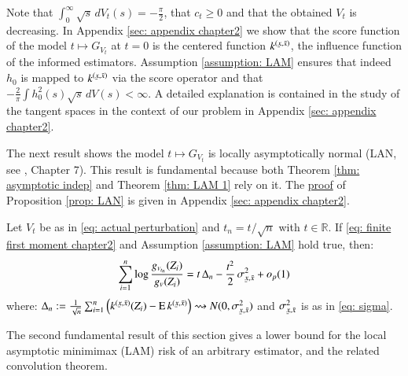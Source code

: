 Note that $ \int_0^{\infty} \sqrt{s} \, d V_t(s)=-\frac{\pi}{2}$, that $c_t \geq 0$ and that the obtained $V_t$ is decreasing. In Appendix \ref{sec: appendix chapter2} we show that the score function of the model $t \mapsto G_{\scriptscriptstyle{V_t}}$ at $t=0$ is the centered function $k^{(\ubar{x},\bar{x})}$, the influence function of the informed estimators. Assumption \ref{assumption: LAM} ensures that indeed $h_0$ is mapped to $k^{(\ubar{x},\bar{x})}$ via the score operator and that $- \frac{2}{\pi}\int h_0^2 (s) \sqrt{s} \, dV(s) < \infty$. A detailed explanation is contained in the study of the tangent spaces in the context of our problem in Appendix \ref{sec: appendix chapter2}. 

The next result shows the model $t \mapsto G_{\scriptscriptstyle{V_t}}$ is locally asymptotically normal (LAN, see \cite{6}, Chapter 7). This result is fundamental because both Theorem \ref{thm: asymptotic indep} and Theorem \ref{thm: LAM 1} rely on it. The \hyperlink{Proof of LAN prop}{proof} of Proposition \ref{prop: LAN} is given in Appendix \ref{sec: appendix chapter2}. 

\begin{proposition}\label{prop: LAN}
Let $V_{t}$ be as in \eqref{eq: actual perturbation} and $t_n = t/ \sqrt{n}$ with $t \in \mathbb{R}$. If \eqref{eq: finite first moment chapter2} and Assumption \ref{assumption: LAM} hold true, then:
\begin{align}\label{eq: linear expansion}
    \sum_{i=1}^n \log{\frac{g_{\scriptscriptstyle{V_{t_n}}}(Z_i)}{g_{\scriptscriptstyle{V}}(Z_i)}} = t \, \Delta_n - \frac{t^2}{2} \, \sigma^2_{\ubar{x},\bar{x}} + o_p(1)
\end{align}
where: $\Delta_n := \frac{1}{\sqrt{n}} \sum_{i=1}^n  \left( k^{(\ubar{x},\bar{x})}(Z_i) - \ex \, k^{(\ubar{x},\bar{x})} \right) \rightsquigarrow N (0, \sigma^2_{\ubar{x},\bar{x}})$ and $\sigma^2_{\ubar{x},\bar{x}}$ is as in \eqref{eq: sigma}.
\end{proposition}

The second fundamental result of this section gives a lower bound for the local asymptotic minimimax (LAM) risk of an arbitrary estimator, and the related convolution theorem. 

